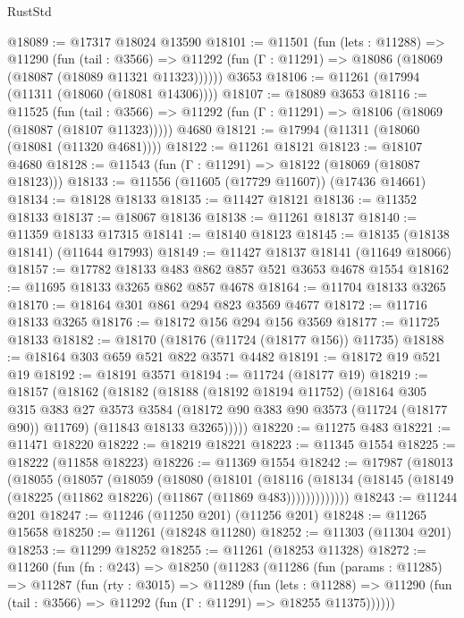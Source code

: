 \begin{lexlean}{RustStd}
\begin{coremodule}
@18089 := @17317 @18024 @13590
@18101 := @11501
    (fun (lets : @11288) =>
    @11290
      (fun (tail : @3566) =>
      @11292 (fun (Γ : @11291) => @18086 (@18069 (@18087 (@18089 @11321 @11323))))))
    @3653
@18106 := @11261 (@17994 (@11311 (@18060 (@18081 @14306))))
@18107 := @18089 @3653
@18116 := @11525
    (fun (tail : @3566) => @11292 (fun (Γ : @11291) => @18106 (@18069 (@18087 (@18107 @11323)))))
    @4680
@18121 := @17994 (@11311 (@18060 (@18081 (@11320 @4681))))
@18122 := @11261 @18121
@18123 := @18107 @4680
@18128 := @11543 (fun (Γ : @11291) => @18122 (@18069 (@18087 @18123)))
@18133 := @11556 (@11605 (@17729 @11607)) (@17436 @14661)
@18134 := @18128 @18133
@18135 := @11427 @18121
@18136 := @11352 @18133
@18137 := @18067 @18136
@18138 := @11261 @18137
@18140 := @11359 @18133 @17315
@18141 := @18140 @18123
@18145 := @18135 (@18138 @18141) (@11644 @17993)
@18149 := @11427 @18137 @18141 (@11649 @18066)
@18157 := @17782 @18133 @483 @862 @857 @521 @3653 @4678 @1554
@18162 := @11695 @18133 @3265 @862 @857 @4678
@18164 := @11704 @18133 @3265
@18170 := @18164 @301 @861 @294 @823 @3569 @4677
@18172 := @11716 @18133 @3265
@18176 := @18172 @156 @294 @156 @3569
@18177 := @11725 @18133
@18182 := @18170 (@18176 (@11724 (@18177 @156)) @11735)
@18188 := @18164 @303 @659 @521 @822 @3571 @4482
@18191 := @18172 @19 @521 @19
@18192 := @18191 @3571
@18194 := @11724 (@18177 @19)
@18219 := @18157
    (@18162
      (@18182
        (@18188
          (@18192 @18194 @11752)
          (@18164
            @305
            @315
            @383
            @27
            @3573
            @3584
            (@18172 @90 @383 @90 @3573 (@11724 (@18177 @90)) @11769)
            (@11843 @18133 @3265)))))
@18220 := @11275 @483
@18221 := @11471 @18220
@18222 := @18219 @18221
@18223 := @11345 @1554
@18225 := @18222 (@11858 @18223)
@18226 := @11369 @1554
@18242 := @17987
    (@18013
      (@18055
        (@18057
          (@18059
            (@18080
              (@18101
                (@18116
                  (@18134 (@18145 (@18149 (@18225 (@11862 @18226) (@11867 (@11869 @483)))))))))))))
@18243 := @11244 @201
@18247 := @11246 (@11250 @201) (@11256 @201)
@18248 := @11265 @15658
@18250 := @11261 (@18248 @11280)
@18252 := @11303 (@11304 @201)
@18253 := @11299 @18252
@18255 := @11261 (@18253 @11328)
@18272 := @11260
    (fun (fn : @243) =>
    @18250
      (@11283
        (@11286
          (fun (params : @11285) =>
          @11287
            (fun (rty : @3015) =>
            @11289
              (fun (lets : @11288) =>
              @11290 (fun (tail : @3566) => @11292 (fun (Γ : @11291) => @18255 @11375))))))

\end{coremodule}
\end{lexlean}
